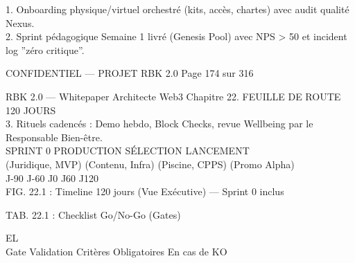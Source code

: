 \documentclass[12pt,landscape,a4paper]{article}
\newenvironment{confidential}
{\begin{tcolorbox}[
    colback=rbkred!5!white,
    colframe=rbkred!75!black,
    title=CONFIDENTIEL,
    fonttitle=\bfseries\color{white},
    coltitle=rbkred!75!black,
    breakable,
    enhanced,
    frame hidden,
    borderline west={2pt}{0pt}{rbkred!75!black}
]}
{\end{tcolorbox}}
\begin{document}
1. Onboarding physique/virtuel orchestré (kits, accès, chartes) avec audit qualité Nexus.\\
\vspace{0.5em}
2. Sprint pédagogique Semaine 1 livré (Genesis Pool) avec NPS \textgreater{} 50 et incident log ”zéro critique”.\\
\vspace{0.5em}
\vspace{0.5em}
\begin{confidential}CONFIDENTIEL — PROJET RBK 2.0                                Page 174 sur 316\end{confidential}
RBK 2.0 — Whitepaper Architecte Web3                                                                                   Chapitre 22. FEUILLE DE ROUTE 120 JOURS\\
\vspace{0.5em}
\vspace{0.5em}
3. Rituels cadencés : Demo hebdo, Block Checks, revue Wellbeing par le Responsable Bien-être.\\
\vspace{0.5em}
\vspace{0.5em}
SPRINT 0               PRODUCTION                SÉLECTION              LANCEMENT\\
(Juridique, MVP)          (Contenu, Infra)         (Piscine, CPPS)         (Promo Alpha)\\
\vspace{0.5em}
\vspace{0.5em}
J-90                      J-60                      J0                      J60                   J120\\
\vspace{0.5em}
FIG. 22.1 : Timeline 120 jours (Vue Exécutive) — Sprint 0 inclus\\
\vspace{0.5em}
\vspace{0.5em}
\begin{center}\begin{tabular}TAB. 22.1 : Checklist Go/No-Go (Gates)\end{tabular}\end{center}
\vspace{0.5em}
\vspace{0.5em}
\vspace{0.5em}
\vspace{0.5em}
EL\\
Gate          Validation      Critères Obligatoires                                  En cas de KO\\
\end{document}
